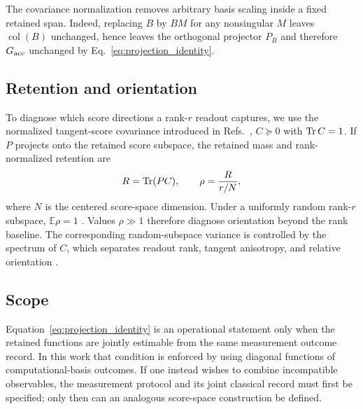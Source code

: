 The covariance normalization removes arbitrary basis scaling inside a fixed retained span. Indeed, replacing $B$ by $BM$ for any nonsingular $M$ leaves $\operatorname{col}(B)$ unchanged, hence leaves the orthogonal projector $P_B$ and therefore $G_{\mathrm{acc}}$ unchanged by Eq.~\eqref{eq:projection_identity}.

\subsection{Retention and orientation}
To diagnose which score directions a rank-$r$ readout captures, we use the normalized tangent-score covariance introduced in Refs.~\cite{AitHaddou2026ReadoutRank,AitHaddou2026SpectralGeometry}, $C\succeq0$ with $\operatorname{Tr} C=1$. If $P$ projects onto the retained score subspace, the retained mass and rank-normalized retention are
\begin{equation}
 R=\operatorname{Tr}(PC),
 \qquad
 \rho=\frac{R}{r/N},
 \label{eq:rho}
\end{equation}
where $N$ is the centered score-space dimension. Under a uniformly random rank-$r$ subspace, $\mathbb E\rho=1$ \cite{AitHaddou2026ReadoutRank,AitHaddou2026SpectralGeometry}. Values $\rho\gg1$ therefore diagnose orientation beyond the rank baseline. The corresponding random-subspace variance is controlled by the spectrum of $C$, which separates readout rank, tangent anisotropy, and relative orientation \cite{AitHaddou2026SpectralGeometry}.

\subsection{Scope}
Equation~\eqref{eq:projection_identity} is an operational statement only when the retained functions are jointly estimable from the same measurement outcome record. In this work that condition is enforced by using diagonal functions of computational-basis outcomes. If one instead wishes to combine incompatible observables, the measurement protocol and its joint classical record must first be specified; only then can an analogous score-space construction be defined.
